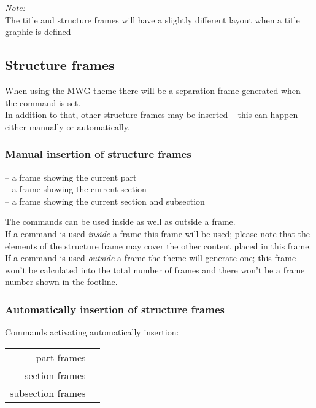\documentclass[11pt]{ltxdoc}
\begin{document}
	\smallskip
	\textit{Note:} \\
	The title and structure frames will have a slightly different layout when a title graphic is defined
	
	
	\subsection{Structure frames}
	When using the MWG theme there will be a separation frame generated when the \texttt{\appendix} command is set. \\
	In addition to that, other structure frames may be inserted -- this can happen either manually or automatically.
	
	\subsubsection*{Manual insertion of structure frames}
	\texttt{\partframe} -- a frame showing the current part \\
	\texttt{\sectionframe} -- a frame showing the current section \\
	\texttt{\subsectionframe} -- a frame showing the current section and subsection
	
	\medskip
	The commands can be used inside as well as outside a frame. \\
	If a command is used \textit{inside} a frame this frame will be used; please note that the elements of the structure frame may cover the other content placed in this frame. \\
	If a command is used \textit{outside} a frame the theme will generate one; this frame won't be calculated into the total number of frames and there won't be a frame number shown in the footline.
	
	
	\subsubsection*{Automatically insertion of structure frames}
	Commands activating automatically insertion: \\[\smallskipamount]\nopagebreak
	\begin{tabular}{rl}
		part frames & \texttt{\activatepartframes} \\
		section frames & \texttt{\activatesectionframes} \\
		subsection frames & \texttt{\activatesubsectionframes}
	\end{tabular}
	
\end{document}
